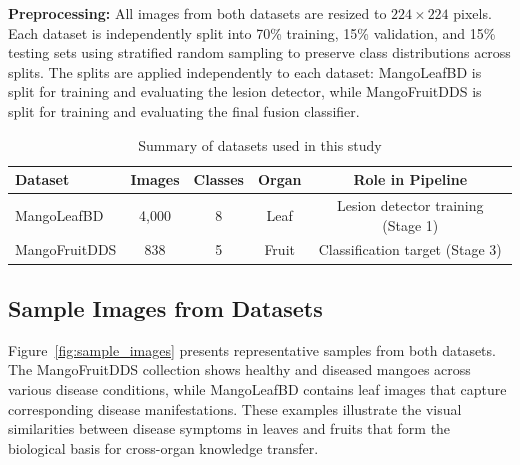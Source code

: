 \documentclass[utf8]{FrontiersinHarvard} %
\begin{document}
\textbf{Preprocessing:} All images from both datasets are resized to $224 \times 224$ pixels. Each dataset is independently split into 70\% training, 15\% validation, and 15\% testing sets using stratified random sampling to preserve class distributions across splits. The splits are applied independently to each dataset: MangoLeafBD is split for training and evaluating the lesion detector, while MangoFruitDDS is split for training and evaluating the final fusion classifier.

\begin{table}[h!]
    \centering
    \caption{Summary of datasets used in this study}
    \label{tab:datasets}
    \footnotesize
    \begin{tabular}{lcccc}
        \toprule
        \textbf{Dataset} & \textbf{Images} & \textbf{Classes} & \textbf{Organ} & \textbf{Role in Pipeline} \\
        \midrule
        MangoLeafBD & 4,000 & 8 & Leaf & Lesion detector training (Stage 1) \\
        MangoFruitDDS & 838 & 5 & Fruit & Classification target (Stage 3) \\
        \bottomrule
    \end{tabular}
\end{table}

\subsection{Sample Images from Datasets}
Figure~\ref{fig:sample_images} presents representative samples from both datasets. The MangoFruitDDS collection shows healthy and diseased mangoes across various disease conditions, while MangoLeafBD contains leaf images that capture corresponding disease manifestations. These examples illustrate the visual similarities between disease symptoms in leaves and fruits that form the biological basis for cross-organ knowledge transfer.
\end{document}
